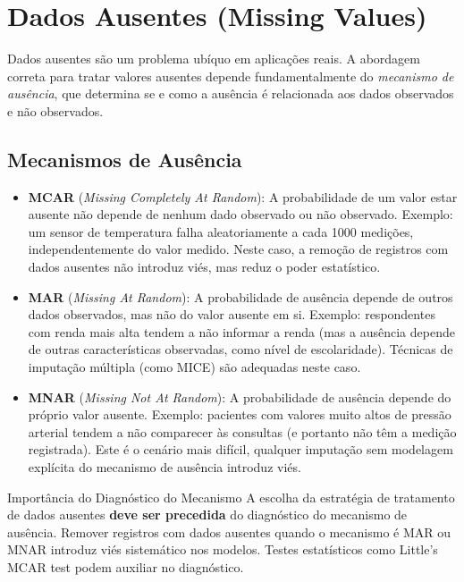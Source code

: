 \documentclass[12pt,a4paper]{article}
\begin{document}
\section{Dados Ausentes (Missing Values)}

Dados ausentes são um problema ubíquo em aplicações reais. A abordagem correta para tratar valores ausentes depende fundamentalmente do \textit{mecanismo de ausência}, que determina se e como a ausência é relacionada aos dados observados e não observados.

\subsection{Mecanismos de Ausência}

\begin{itemize}[leftmargin=*]
  \item \textbf{MCAR} (\textit{Missing Completely At Random}): A probabilidade de um valor estar ausente não depende de nenhum dado observado ou não observado. Exemplo: um sensor de temperatura falha aleatoriamente a cada 1000 medições, independentemente do valor medido. Neste caso, a remoção de registros com dados ausentes não introduz viés, mas reduz o poder estatístico.

  \item \textbf{MAR} (\textit{Missing At Random}): A probabilidade de ausência depende de outros dados observados, mas não do valor ausente em si. Exemplo: respondentes com renda mais alta tendem a não informar a renda (mas a ausência depende de outras características observadas, como nível de escolaridade). Técnicas de imputação múltipla (como MICE) são adequadas neste caso.

  \item \textbf{MNAR} (\textit{Missing Not At Random}): A probabilidade de ausência depende do próprio valor ausente. Exemplo: pacientes com valores muito altos de pressão arterial tendem a não comparecer às consultas (e portanto não têm a medição registrada). Este é o cenário mais difícil, qualquer imputação sem modelagem explícita do mecanismo de ausência introduz viés.
\end{itemize}

\begin{atencaobox}{Importância do Diagnóstico do Mecanismo}
A escolha da estratégia de tratamento de dados ausentes \textbf{deve ser precedida} do diagnóstico do mecanismo de ausência. Remover registros com dados ausentes quando o mecanismo é MAR ou MNAR introduz viés sistemático nos modelos. Testes estatísticos como Little's MCAR test podem auxiliar no diagnóstico.
\end{atencaobox}
\end{document}
